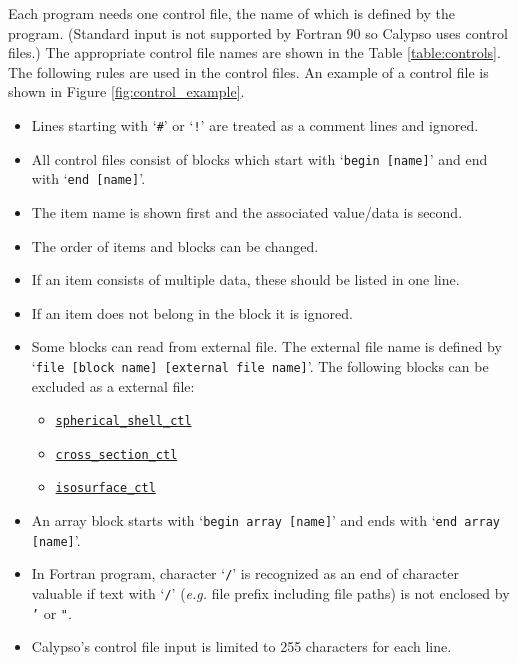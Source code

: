 Each program needs one control file, the name of which is defined by the program.
 (Standard input is not supported by Fortran 90 so Calypso uses control files.)
The appropriate control file names are shown in the Table \ref{table:controls}. 
The following rules are used in the control files. An example of a control file is shown in Figure \ref{fig:control_example}.
%
\begin{itemize}
\item Lines starting with `\verb|#|' or `\verb|!|' are treated as a comment lines and ignored. 
\item All control files consist of blocks which start with `\verb|begin [name]|' and end with `\verb|end [name]|'.
\item The item name is shown first and the associated value/data is second.
\item The order of items and blocks can be changed.
\item If an item consists of multiple data, these should be listed in one line.
\item If an item does not belong in the block it is ignored.
\item Some blocks can read from external file. The external file name is defined by `\verb|file [block name] [external file name]|'. The following blocks can be excluded as a external file:
	\begin{itemize}
	\item \hyperref[href_t:spherical_shell_ctl]{\tt spherical\_shell\_ctl}
	\item \hyperref[href_t:cross_section_ctl]{\tt cross\_section\_ctl}
	\item \hyperref[href_t:isosurface_ctl]{\tt isosurface\_ctl}
	\end{itemize}
%
\item An array block starts with `\verb|begin array [name]|' and ends with `\verb|end array [name]|'.
\item In Fortran program, character `\verb|/|' is recognized as an end of character valuable if text with `\verb|/|' ({\it e.g.} file prefix including file paths) is not enclosed by {\tt '} or {\tt "}.
\item Calypso's control file input is limited to 255 characters for each line.
\end{itemize}
%
